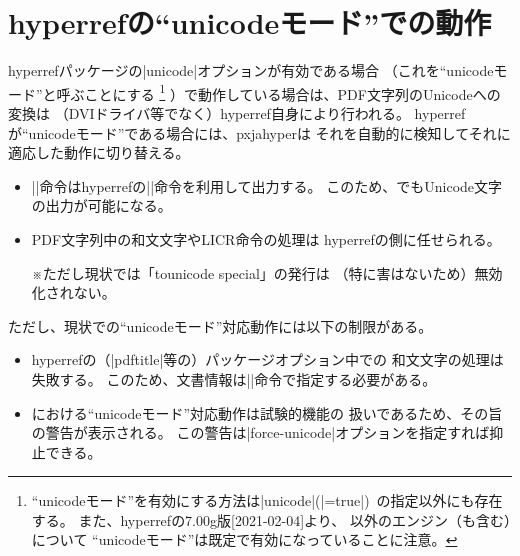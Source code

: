 \documentclass[uplatex,dvipdfmx,a4paper]{jsarticle}
\renewcommand{\headfont}{\gtfamily\romanseries{sbc}\sffamily}
\newcommand{\Pkg}[1]{\textsf{#1}}
\newcommand{\Note}{\par\noindent ※}
\providecommand{\Strong}[1]{{\headfont#1}}
\begin{document}
\section{hyperrefの“unicodeモード”での動作}
\label{sec:Unicode-mode}

\Pkg{hyperref}パッケージの|unicode|オプションが有効である場合
（これを“unicodeモード”と呼ぶことにする
\footnote{“unicodeモード”を有効にする方法は|unicode|(|=true|)\,%
  の指定以外にも存在する。
  また、\Pkg{hyperref}の7.00g版[2021-02-04]より、
  {\pLaTeX}以外のエンジン（\Strong{{\upLaTeX}も含む}）について
  “unicodeモード”は既定で有効になっていることに注意。}%
）で動作している場合は、PDF文字列のUnicodeへの変換は
（DVIドライバ等でなく）\Pkg{hyperref}自身により行われる。
\Pkg{hyperref}が“unicodeモード”である場合には、\Pkg{pxjahyper}は
それを自動的に検知してそれに適応した動作に切り替える。
\begin{itemize}
\item |\Ux|命令は\Pkg{hyperref}の|\unichar|命令を利用して出力する。
  このため、{\pLaTeX}でもUnicode文字の出力が可能になる。
\item PDF文字列中の和文文字やLICR命令の処理は
  \Pkg{hyperref}の側に任せられる。
  \Note ただし現状では「tounicode special」の発行は
  （特に害はないため）無効化されない。
\end{itemize}
ただし、現状での“unicodeモード”対応動作には以下の制限がある。
\begin{itemize}
\item \Pkg{hyperref}の（|pdftitle|等の）パッケージオプション中での
  和文文字の処理は失敗する。
  このため、文書情報は|\hypersetup|命令で指定する必要がある。
\item {\pLaTeX}における“unicodeモード”対応動作は試験的機能の
  扱いであるため、その旨の警告が表示される。
  この警告は|force-unicode|オプションを指定すれば抑止できる。
\end{itemize}
\end{document}
